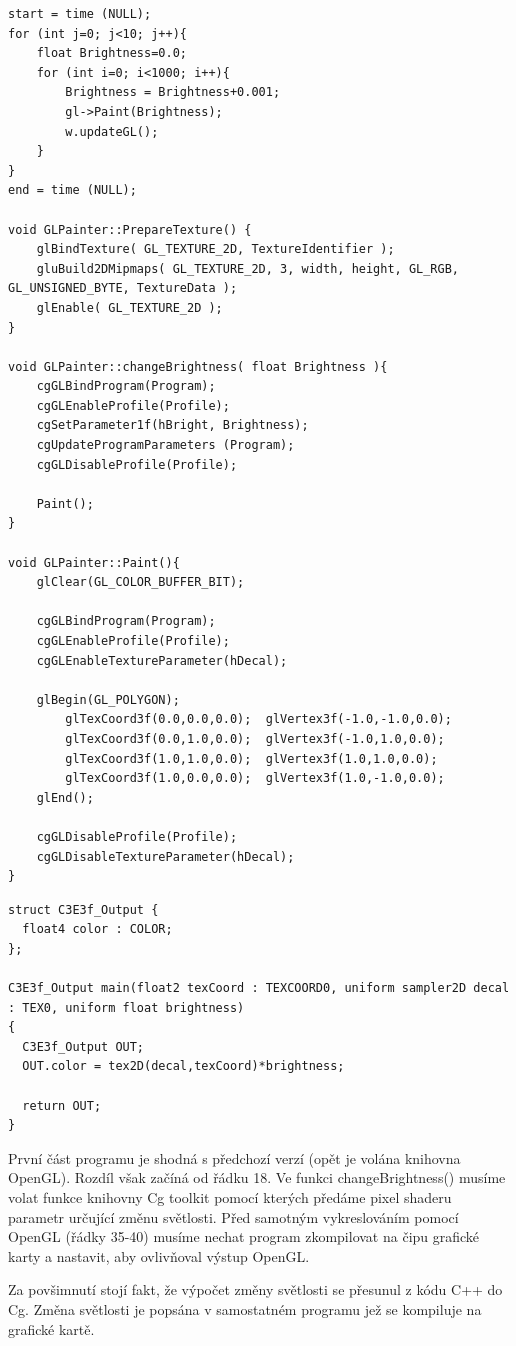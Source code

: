 \begin{lstlisting}[label=DicomImageClass,caption={...}]
start = time (NULL);
for (int j=0; j<10; j++){
	float Brightness=0.0;
	for (int i=0; i<1000; i++){
		Brightness = Brightness+0.001;
		gl->Paint(Brightness);
		w.updateGL();
	}
}
end = time (NULL);

void GLPainter::PrepareTexture() {
	glBindTexture( GL_TEXTURE_2D, TextureIdentifier );
	gluBuild2DMipmaps( GL_TEXTURE_2D, 3, width, height, GL_RGB, GL_UNSIGNED_BYTE, TextureData );
	glEnable( GL_TEXTURE_2D );
}

void GLPainter::changeBrightness( float Brightness ){
	cgGLBindProgram(Program);
	cgGLEnableProfile(Profile);
	cgSetParameter1f(hBright, Brightness);
	cgUpdateProgramParameters (Program);
	cgGLDisableProfile(Profile);

	Paint();
}

void GLPainter::Paint(){
	glClear(GL_COLOR_BUFFER_BIT);

	cgGLBindProgram(Program);
	cgGLEnableProfile(Profile);
	cgGLEnableTextureParameter(hDecal);

	glBegin(GL_POLYGON);
		glTexCoord3f(0.0,0.0,0.0);	glVertex3f(-1.0,-1.0,0.0);
		glTexCoord3f(0.0,1.0,0.0);	glVertex3f(-1.0,1.0,0.0);
		glTexCoord3f(1.0,1.0,0.0);	glVertex3f(1.0,1.0,0.0);
		glTexCoord3f(1.0,0.0,0.0);	glVertex3f(1.0,-1.0,0.0);
	glEnd();

	cgGLDisableProfile(Profile);
	cgGLDisableTextureParameter(hDecal);
}
\end{lstlisting}

\begin{lstlisting}[label=DicomImageClass,caption={...}]
struct C3E3f_Output {
  float4 color : COLOR;
};

C3E3f_Output main(float2 texCoord : TEXCOORD0, uniform sampler2D decal : TEX0, uniform float brightness)
{
  C3E3f_Output OUT;
  OUT.color = tex2D(decal,texCoord)*brightness;

  return OUT;
}
\end{lstlisting}

První část programu je shodná s předchozí verzí (opět je volána knihovna OpenGL). Rozdíl však začíná od řádku 18. Ve funkci changeBrightness() musíme volat funkce knihovny Cg toolkit pomocí kterých předáme pixel shaderu parametr určující změnu světlosti. Před samotným vykreslováním pomocí OpenGL (řádky 35-40) musíme nechat program zkompilovat na čipu grafické karty a nastavit, aby ovlivňoval výstup OpenGL.

Za povšimnutí stojí fakt, že výpočet změny světlosti se přesunul z kódu C++ do Cg. Změna světlosti je popsána v samostatném programu jež se kompiluje na grafické kartě.



